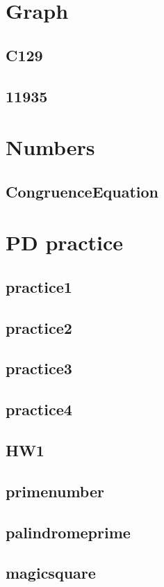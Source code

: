 

\section{Graph}
    \subsection{C129}
        
    \subsection{11935}
        

\section{Numbers}
    \subsection{CongruenceEquation}
        

\section{PD practice}
    \subsection{practice1}
        
    \subsection{practice2}
        
    \subsection{practice3}
        
    \subsection{practice4}
        
    \subsection{HW1}
        
    \subsection{primenumber}
        
    \subsection{palindromeprime}
        
    \subsection{magicsquare}
        
        